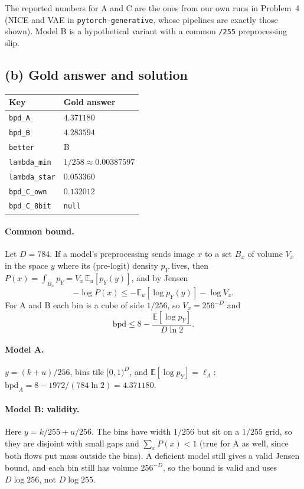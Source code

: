 \documentclass[11pt]{article}
\newcommand{\E}{\mathbb{E}}
\begin{document}
The reported numbers for A and C are the ones from our own runs in
Problem~4 (NICE and VAE in \texttt{pytorch-generative}, whose pipelines are
exactly those shown). Model B is a hypothetical variant with a common
\texttt{/255} preprocessing slip.

\subsection{(b) Gold answer and solution}

\begin{center}
\begin{tabular}{@{}ll@{}}
\toprule
Key & Gold answer\\
\midrule
\texttt{bpd\_A} & \(4.371180\)\\
\texttt{bpd\_B} & \(4.283594\)\\
\texttt{better} & B\\
\texttt{lambda\_min} & \(1/258\approx0.00387597\)\\
\texttt{lambda\_star} & \(0.053360\)\\
\texttt{bpd\_C\_own} & \(0.132012\)\\
\texttt{bpd\_C\_8bit} & \texttt{null}\\
\bottomrule
\end{tabular}
\end{center}

\paragraph{Common bound.} Let \(D=784\). If a model's preprocessing sends
image \(x\) to a set \(B_x\) of volume \(V_x\) in the space \(y\) where its
(pre-logit) density \(p_Y\) lives, then
\(P(x)=\int_{B_x}p_Y=V_x\,\E_u[p_Y(y)]\), and by Jensen
\[
  -\log P(x)\le-\E_u[\log p_Y(y)]-\log V_x .
\]
For A and B each bin is a cube of side \(1/256\), so \(V_x=256^{-D}\) and
\[
  \mathrm{bpd}\le 8-\frac{\E[\log p_Y]}{D\ln 2}.
\]

\paragraph{Model A.} \(y=(k+u)/256\), bins tile \([0,1)^D\), and
\(\E[\log p_Y]=\ell_A\):
\(\mathrm{bpd}_A=8-1972/(784\ln2)=4.371180\).

\paragraph{Model B: validity.} Here \(y=k/255+u/256\). The bins have width
\(1/256\) but sit on a \(1/255\) grid, so they are disjoint with small gaps
and \(\sum_xP(x)<1\) (true for A as well, since both flows put mass outside
the bins). A deficient model still gives a valid Jensen bound, and each bin
still has volume \(256^{-D}\), so the bound is valid and uses \(D\log256\),
not \(D\log255\).
\end{document}
